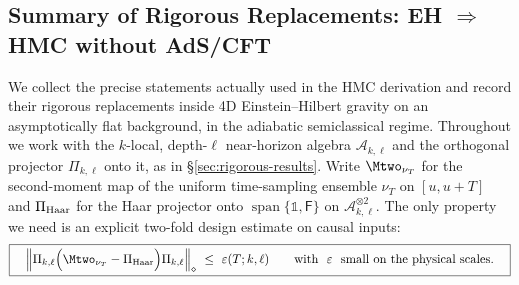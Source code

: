 \documentclass[aps,prd,preprint,onecolumn,superscriptaddress,nofootinbib,longbibliography,floatfix,11pt,showpacs,showkeys]{revtex4-2}
\theoremstyle{plain}
\theoremstyle{definition}
\theoremstyle{remark}
\begin{document}
\subsection{Summary of Rigorous Replacements: EH \texorpdfstring{$\Rightarrow$}{=>} HMC without AdS/CFT}\label{sec:eh-to-hmc-summary}
We collect the precise statements actually used in the HMC derivation and record their rigorous replacements inside 4D Einstein--Hilbert gravity on an asymptotically flat background, in the adiabatic semiclassical regime.
Throughout we work with the $k$-local, depth-$\ell$ near-horizon algebra $\mathscr{A}_{k,\ell}$ and the orthogonal projector $\Pi_{k,\ell}$ onto it, as in \S\ref{sec:rigorous-results}. Write $\Mtwo_{\nu_T}$ for the second-moment map of the uniform time-sampling ensemble $\nu_T$ on $[u,u+T]$ and $\Pi_{\rm Haar}$ for the Haar projector onto $\operatorname{span}\{\mathbb{1},\mathsf{F}\}$ on $\mathscr{A}_{k,\ell}^{\otimes 2}$.
The only property we need is an explicit two-fold design estimate on causal inputs:
\begin{equation}
\label{eq:twirl-design-bound}
\boxed{\quad
\left\|
\Pi_{k,\ell}\Big(\Mtwo_{\nu_T}-\Pi_{\rm Haar}\Big)\Pi_{k,\ell}
\right\|_{\diamond}\ \le\ \varepsilon(T;k,\ell)\qquad\text{with $\ \varepsilon\ $ small on the physical scales.}\quad}
\end{equation}
\end{document}
